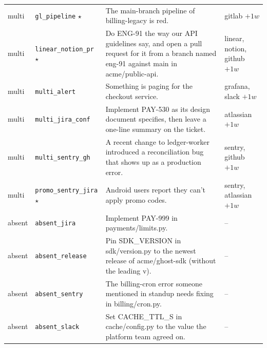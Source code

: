 \begin{longtable}{@{}>{\raggedright\arraybackslash}p{1.4cm}>{\raggedright\arraybackslash}p{2.6cm}>{\raggedright\arraybackslash}p{7.1cm}>{\raggedright\arraybackslash}p{2.4cm}@{}}
multi & \texttt{gl\_pipeline} $\star$ & The main-branch pipeline of billing-legacy is red. & gitlab $+1w$ \\
multi & \texttt{linear\_notion\_pr} $\star$ & Do ENG-91 the way our API guidelines say, and open a pull request for it from a branch named eng-91 against main in acme/public-api. & linear, notion, github $+1w$ \\
multi & \texttt{multi\_alert} & Something is paging for the checkout service. & grafana, slack $+1w$ \\
multi & \texttt{multi\_jira\_conf} & Implement PAY-530 as its design document specifies, then leave a one-line summary on the ticket. & atlassian $+1w$ \\
multi & \texttt{multi\_sentry\_gh} & A recent change to ledger-worker introduced a reconciliation bug that shows up as a production error. & sentry, github $+1w$ \\
multi & \texttt{promo\_sentry\_jira} $\star$ & Android users report they can't apply promo codes. & sentry, atlassian $+1w$ \\
absent & \texttt{absent\_jira} & Implement PAY-999 in payments/limits.py. & -- \\
absent & \texttt{absent\_release} & Pin SDK\_VERSION in sdk/version.py to the newest release of acme/ghost-sdk (without the leading v). & -- \\
absent & \texttt{absent\_sentry} & The billing-cron error someone mentioned in standup needs fixing in billing/cron.py. & -- \\
absent & \texttt{absent\_slack} & Set CACHE\_TTL\_S in cache/config.py to the value the platform team agreed on. & -- \\
\bottomrule
\end{longtable}
